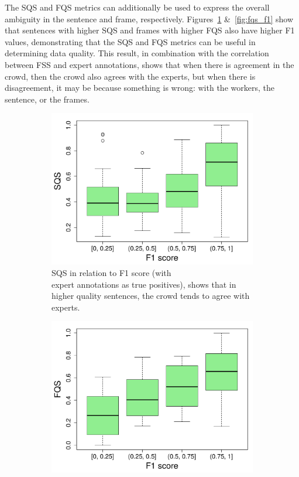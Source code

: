 The SQS and FQS metrics can additionally be used to express the overall ambiguity in the sentence and frame, respectively. Figures~\ref{fig:sqs_f1} \&~\ref{fig:fqs_f1} show that sentences with higher SQS and frames with higher FQS also have higher F1 values, demonstrating that the SQS and FQS metrics can be useful in determining data quality. This result, in combination with the correlation between FSS and expert annotations, shows that when there is agreement in the crowd, then the crowd also agrees with the experts, but when there is disagreement, it may be because something is wrong: with the workers, the sentence, or the frames.

\begin{figure}[htb!]
\centering
\begin{subfigure}{.5\textwidth}
\centering
\includegraphics[width=\linewidth]{img/sqs_f1.pdf}
\caption{SQS in relation to F1 score (with \\ expert annotations as true positives), shows that in higher quality sentences, the crowd tends to agree with experts.}
\label{fig:sqs_f1}
\end{subfigure}%
\begin{subfigure}{.5\textwidth}
\centering
\includegraphics[width=\linewidth]{img/fqs_f1.pdf}

\end{subfigure}
\end{figure}
